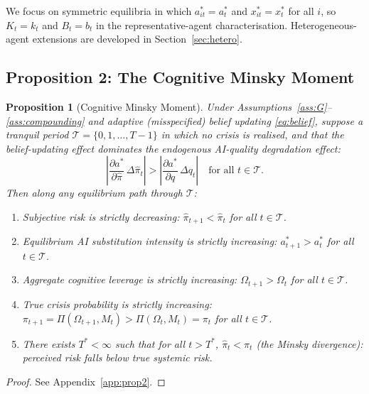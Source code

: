 \documentclass[12pt]{article}
\newtheorem{proposition}{Proposition}
\newcommand{\hpi}{\hat{\pi}}
\begin{document}
We focus on symmetric equilibria in which $a_{it}^* = a_t^*$ and $x_{it}^* = x_t^*$
for all $i$, so $K_t = k_t$ and $B_t = b_t$ in the representative-agent
characterisation. Heterogeneous-agent extensions are developed in
Section~\ref{sec:hetero}.

\subsection{Proposition 2: The Cognitive Minsky Moment}

\begin{proposition}[Cognitive Minsky Moment]
\label{prop:minsky}
Under Assumptions~\ref{ass:G}--\ref{ass:compounding} and adaptive (misspecified)
belief updating \eqref{eq:belief}, suppose a tranquil period
$\mathcal{T} = \{0, 1, \ldots, T-1\}$ in which no crisis is realised, and that the
belief-updating effect dominates the endogenous AI-quality degradation effect:
\begin{equation}
\left|\frac{\partial a^*}{\partial \hpi}\,\Delta\hpi_t\right|
> \left|\frac{\partial a^*}{\partial q}\,\Delta q_t\right|
\quad \text{for all } t \in \mathcal{T}.
\label{eq:dominance}
\end{equation}
Then along any equilibrium path through $\mathcal{T}$:
\begin{enumerate}
\item[\emph{(i)}] Subjective risk is strictly decreasing: $\hpi_{t+1} < \hpi_t$
for all $t \in \mathcal{T}$.
\item[\emph{(ii)}] Equilibrium AI substitution intensity is strictly increasing:
$a_{t+1}^* > a_t^*$ for all $t \in \mathcal{T}$.
\item[\emph{(iii)}] Aggregate cognitive leverage is strictly increasing:
$\Omega_{t+1} > \Omega_t$ for all $t \in \mathcal{T}$.
\item[\emph{(iv)}] True crisis probability is strictly increasing:
$\pi_{t+1} = \Pi(\Omega_{t+1},M_t) > \Pi(\Omega_t,M_t) = \pi_t$ for all $t \in \mathcal{T}$.
\item[\emph{(v)}] There exists $T^* < \infty$ such that for all $t > T^*$,
$\hpi_t < \pi_t$ \emph{(the Minsky divergence)}: perceived risk falls below true
systemic risk.
\end{enumerate}
\end{proposition}

\begin{proof}
See Appendix~\ref{app:prop2}.
\end{proof}
\end{document}
